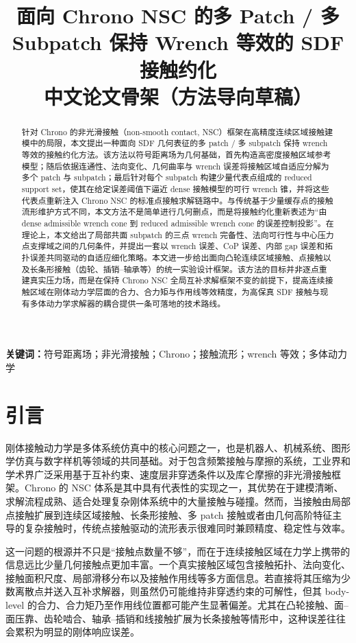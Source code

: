 \documentclass[UTF8,a4paper,11pt]{ctexart}
\title{面向 Chrono NSC 的多 Patch / 多 Subpatch 保持 Wrench 等效的 SDF 接触约化\\中文论文骨架（方法导向草稿）}
\author{}
\date{}
\begin{document}
\maketitle

\begin{abstract}
针对 Chrono 的非光滑接触（non-smooth contact, NSC）框架在高精度连续区域接触建模中的局限，本文提出一种面向 SDF 几何表征的多 patch / 多 subpatch 保持 wrench 等效的接触约化方法。该方法以符号距离场为几何基础，首先构造高密度接触区域参考模型；随后依据连通性、法向变化、几何曲率与 wrench 误差将接触区域自适应分解为多个 patch 与 subpatch；最后针对每个 subpatch 构建少量代表点组成的 reduced support set，使其在给定误差阈值下逼近 dense 接触模型的可行 wrench 锥，并将这些代表点重新注入 Chrono NSC 的标准点接触求解链路中。与传统基于少量缓存点的接触流形维护方式不同，本文方法不是简单进行几何删点，而是将接触约化重新表述为“由 dense admissible wrench cone 到 reduced admissible wrench cone 的误差控制投影”。在理论上，本文给出了局部共面 subpatch 的三点 wrench 完备性、法向可行性与中心压力点支撑域之间的几何条件，并提出一套以 wrench 误差、CoP 误差、内部 gap 误差和拓扑误差共同驱动的自适应细化策略。本文进一步给出面向凸轮连续区域接触、点接触以及长条形接触（齿轮、插销--轴承等）的统一实验设计框架。该方法的目标并非逐点重建真实压力场，而是在保持 Chrono NSC 全局互补求解框架不变的前提下，提高连续接触区域在刚体动力学层面的合力、合力矩与作用线等效精度，为高保真 SDF 接触与现有多体动力学求解器的耦合提供一条可落地的技术路线。
\end{abstract}

\noindent\textbf{关键词：}符号距离场；非光滑接触；Chrono；接触流形；wrench 等效；多体动力学

\tableofcontents
\clearpage

\section{引言}

刚体接触动力学是多体系统仿真中的核心问题之一，也是机器人、机械系统、图形学仿真与数字样机等领域的共同基础。对于包含频繁接触与摩擦的系统，工业界和学术界广泛采用基于互补约束、速度层非穿透条件以及库仑摩擦的非光滑接触框架。Chrono 的 NSC 体系是其中具有代表性的实现之一，其优势在于建模清晰、求解流程成熟、适合处理复杂刚体系统中的大量接触与碰撞。然而，当接触由局部点接触扩展到连续区域接触、长条形接触、多 patch 接触或者由几何高阶特征主导的复杂接触时，传统点接触驱动的流形表示很难同时兼顾精度、稳定性与效率。

这一问题的根源并不只是“接触点数量不够”，而在于连续接触区域在力学上携带的信息远比少量几何接触点更加丰富。一个真实接触区域包含接触拓扑、法向变化、接触面积尺度、局部滑移分布以及接触作用线等多方面信息。若直接将其压缩为少数离散点并送入互补求解器，则虽然仍可能维持非穿透约束的可解性，但其 body-level 的合力、合力矩乃至作用线位置都可能产生显著偏差。尤其在凸轮接触、面--面压靠、齿轮啮合、轴承--插销和线接触扩展为长条接触等情形中，这种误差往往会累积为明显的刚体响应误差。
\end{document}
